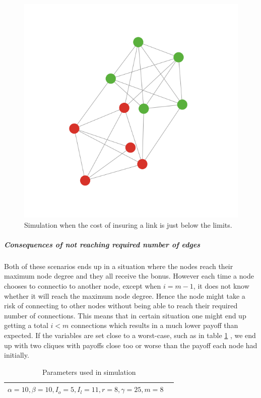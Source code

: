 \begin{figure}[h]
\centering
  \includegraphics[width=0.8\linewidth]{../Figures/BonusGameViolating.png}
  \caption{\label{fig:bonusviolating} Simulation when the cost of insuring a link is just below the limits. }
\end{figure}


\subparagraph{Consequences of not reaching required number of edges}
Both of these scenarios ends up in a situation where the nodes reach their maximum node degree and they all receive the bonus. However each time a node chooses to connectio to another node, except when $i=m-1$, it does not know whether it will reach the maximum node degree. Hence the node might take a risk of connecting to other nodes without being able to reach their required number of connections. This means that in certain situation one might end up getting a total $i<m$ connections which results in a much lower payoff than expected. If the variables are set close to a worst-case, such as in table \ref{tbl:maxdegrevalueswitherror} , we end up with two cliques with payoffs close too or worse than the payoff each node had initially. 

\begin{table}[h]
\centering
\begin{tabular}{lc}
 \hline
  $\alpha=10,
  \beta=10,
  I_{o}=5,
  I_{l}=11,
  r=8,
  \gamma=25,
  m=8
  $
  \\
  \hline
\end{tabular}
\caption{Parameters used in simulation \label{tbl:maxdegrevalueswitherror}}
\end{table}

